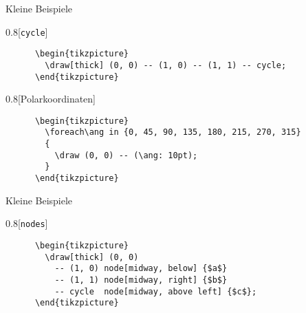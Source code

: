 \begin{frame}[fragile]{Kleine Beispiele}
  \begin{CodeExample}{0.8}[\texttt{cycle}]
    \begin{lstlisting}
      \begin{tikzpicture}
        \draw[thick] (0, 0) -- (1, 0) -- (1, 1) -- cycle;
      \end{tikzpicture}
    \end{lstlisting}
  \CodeResult
  \end{CodeExample}
  \begin{CodeExample}{0.8}[Polarkoordinaten]
    \begin{lstlisting}
      \begin{tikzpicture}
        \foreach\ang in {0, 45, 90, 135, 180, 215, 270, 315}
        {
          \draw (0, 0) -- (\ang: 10pt);
        }
      \end{tikzpicture}
    \end{lstlisting}
  \CodeResult
  \end{CodeExample}
\end{frame}

\begin{frame}[fragile]{Kleine Beispiele}
  \begin{CodeExample}{0.8}[\texttt{nodes}]
    \begin{lstlisting}
      \begin{tikzpicture}
        \draw[thick] (0, 0)
          -- (1, 0) node[midway, below] {$a$}
          -- (1, 1) node[midway, right] {$b$}
          -- cycle  node[midway, above left] {$c$};
      \end{tikzpicture}
    \end{lstlisting}
  \CodeResult
  \end{CodeExample}
\end{frame}
